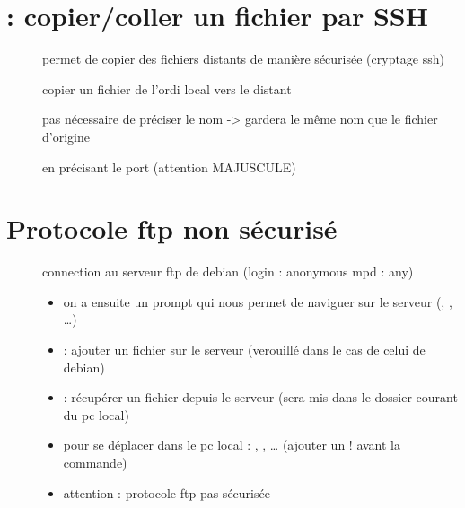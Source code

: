 \documentclass[letterpaper,10pt,french]{sphinxmanual}
\begin{document}
\section{ : copier/coller un fichier par SSH}
\label{\detokenize{17-transferer-fichiers:scp-copier-coller-un-fichier-par-ssh}}\begin{description}
\item[{}] \leavevmode
permet de copier des fichiers distants de manière sécurisée (cryptage ssh)

\item[{}] \leavevmode
copier un fichier de l’ordi local vers le distant

\item[{}] \leavevmode
pas nécessaire de préciser le nom -\textgreater{} gardera le même nom que le fichier d’origine

\item[{}] \leavevmode
en précisant le port (attention MAJUSCULE)

\end{description}


\section{Protocole ftp non sécurisé}
\label{\detokenize{17-transferer-fichiers:protocole-ftp-non-securise}}\begin{description}
\item[{}] \leavevmode
connection au serveur ftp de debian (login : anonymous mpd : any)
\begin{itemize}
\item {} 
on a ensuite un prompt qui nous permet de naviguer sur le serveur (, , …)

\item {} 
 : ajouter un fichier sur le serveur (verouillé dans le cas de celui de debian)

\item {} 
 : récupérer un fichier depuis le serveur (sera mis dans le dossier courant du pc local)

\item {} 
pour se déplacer dans le pc local : , , … (ajouter un ! avant la commande)

\item {} 
attention : protocole ftp pas sécurisée

\end{itemize}

\end{description}
\end{document}
